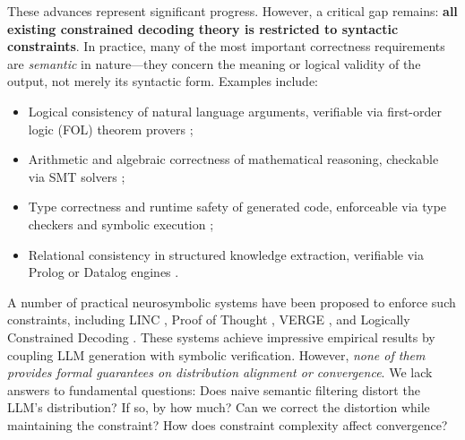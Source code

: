 \documentclass[twoside,11pt]{article}
\begin{document}
These advances represent significant progress. However, a critical gap
remains: \textbf{all existing constrained decoding theory is restricted to
syntactic constraints}. In practice, many of the most important correctness
requirements are \emph{semantic} in nature---they concern the meaning or
logical validity of the output, not merely its syntactic form. Examples
include:
\begin{itemize}
    \item Logical consistency of natural language arguments, verifiable via
    first-order logic (FOL) theorem provers \citep{olausson2023linc,
    ganguly2024pot};
    \item Arithmetic and algebraic correctness of mathematical reasoning,
    checkable via SMT solvers \citep{demoura2008z3};
    \item Type correctness and runtime safety of generated code, enforceable
    via type checkers and symbolic execution \citep{chen2021evaluating};
    \item Relational consistency in structured knowledge extraction,
    verifiable via Prolog or Datalog engines \citep{ma2025logically}.
\end{itemize}

A number of practical neurosymbolic systems have been proposed to enforce
such constraints, including LINC \citep{olausson2023linc}, Proof of Thought
\citep{ganguly2024pot}, VERGE \citep{verge2026}, and Logically Constrained
Decoding \citep{ma2025logically}. These systems achieve impressive empirical
results by coupling LLM generation with symbolic verification. However,
\emph{none of them provides formal guarantees on distribution alignment or
convergence}. We lack answers to fundamental questions: Does naive semantic
filtering distort the LLM's distribution? If so, by how much? Can we
correct the distortion while maintaining the constraint? How does constraint
complexity affect convergence?
\end{document}
